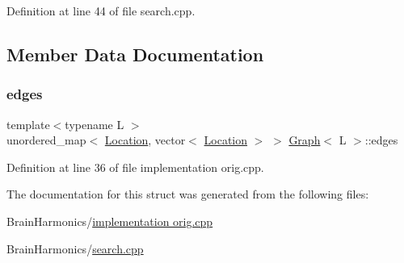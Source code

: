 Definition at line 44 of file search.\+cpp.



\subsection{Member Data Documentation}
\mbox{\label{struct_graph_a8b01818e086835dc5d24ec4082afeef0}} 
\subsubsection{\texorpdfstring{edges}{edges}}
{\footnotesize\ttfamily template$<$typename L $>$ \\
unordered\+\_\+map$<$ \hyperlink{struct_graph_aea7d42bb67163fe692353674435a1426}{Location}, vector$<$ \hyperlink{struct_graph_aea7d42bb67163fe692353674435a1426}{Location} $>$ $>$ \hyperlink{struct_graph}{Graph}$<$ L $>$\+::edges}



Definition at line 36 of file implementation orig.\+cpp.



The documentation for this struct was generated from the following files\+:\begin{DoxyCompactItemize}
\item 
Brain\+Harmonics/\hyperlink{implementation_01orig_8cpp}{implementation orig.\+cpp}\item 
Brain\+Harmonics/\hyperlink{search_8cpp}{search.\+cpp}\end{DoxyCompactItemize}
